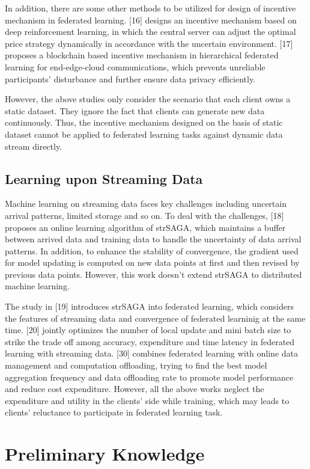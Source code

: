 \documentclass{article}
\theoremstyle{plain}
\theoremstyle{definition}
\theoremstyle{remark}
\begin{document}
In addition, there are some other methods to be utilized for design of incentive mechanism in federated learning.
[16] designs an incentive mechanism based on deep reinforcement learning, in which the central server can adjust the optimal price strategy dynamically in accordance with the uncertain environment.
[17] proposes a blockchain based incentive mechanism in hierarchical federated learning for end-edge-cloud communications, which prevents unreliable participants' disturbance and further ensure data privacy efficiently.

However, the above studies only consider the scenario that each client owns a static dataset. They ignore the fact that clients can generate new data continuously.
Thus, the incentive mechanism designed on the basis of static dataset cannot be applied to federated learning tasks against dynamic data stream directly.

\subsection{Learning upon Streaming Data}
Machine learning on streaming data faces key challenges including uncertain arrival patterns, limited storage and so on.
To deal with the challenges, [18] proposes an online learning algorithm of strSAGA, which maintains a buffer between arrived data and training data to handle the uncertainty of data arrival patterns.
In addition, to enhance the stability of convergence, the gradient used for model updating is computed on new data points at first and then revised by previous data points.
However, this work doesn't extend strSAGA to distributed machine learning.

The study in [19] introduces strSAGA into federated learning, which considers the features of streaming data and convergence of federated learninig at the same time.
[20] jointly optimizes the number of local update and mini batch size to strike the trade off among accuracy, expenditure and time latency in federated learning with streaming data.
[30] combines federated learning with online data management and computation offloading, trying to find the best model aggregation frequency and data offloading rate to promote model performance and reduce cost expenditure.
However, all the above works neglect the expenditure and utility in the clients' side while training, which may leads to clients' reluctance to participate in federated learning task.

\section{Preliminary Knowledge}
\end{document}
